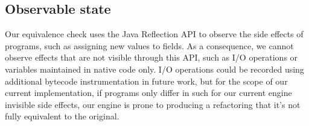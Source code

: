 \documentclass[sigconf,review,anonymous]{acmart}
\begin{document}



%


\subsection{Observable state}\label{sec:observable}

Our equivalence check uses the Java Reflection API to observe the side effects
of programs, such as assigning new values to fields. As a consequence, we cannot
observe effects that are not visible through this API, such as I/O operations or
variables maintained in native code only. I/O operations could be recorded using
additional bytecode instrumentation in future work, but for the scope of our current
implementation, if programs only differ in such for our current engine invisible
side effects, our engine is prone to producing a refactoring that it's not fully equivalent to the original.
\end{document}
